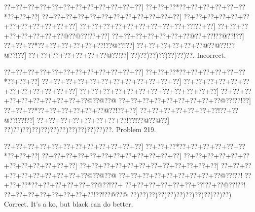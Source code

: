 \documentclass[a5paper]{article}
\begin{document}
\begin{center}
{\goo
\0??+\0??+\0??+\0??+\0??+\0??+\0??+\0??+\0??+\0??+\0??+\0??]
\0??+\0??+\0??*\0??+\0??+\0??+\0??+\0??+\0??*\0??+\0??+\0??]
\0??+\0??+\0??+\0??+\0??+\0??+\0??+\0??+\0??+\0??+\0??+\0??]
\0??+\0??+\0??+\0??+\0??+\0??+\0??+\0??+\0??+\0??+\0??+\0??]
\0??+\0??+\0??+\0??+\0??+\0??+\0??+\0??+\0??+\0??!\0??+\0??]
\0??+\0??+\0??+\0??+\0??+\0??+\0??+\0??@\0??@\0??!\0??+\0??]
\0??+\0??+\0??+\0??+\0??+\0??+\0??@\0??+\0??!\0??@\0??!\0??]
\0??+\0??+\0??*\0??+\0??+\0??+\0??+\0??+\0??!\0??@\0??!\0??]
\0??+\0??+\0??+\0??+\0??+\0??@\0??@\0??!\0??@\0??!\0??]
\0??+\0??+\0??+\0??+\0??+\0??+\0??@\0??!\0??]
\0??)\0??)\0??)\0??)\0??)\0??)\0??.
}
Incorrect. 

\end{center}
\newpage
\begin{center}
{\goo
\0??+\0??+\0??+\0??+\0??+\0??+\0??+\0??+\0??+\0??+\0??+\0??]
\0??+\0??+\0??*\0??+\0??+\0??+\0??+\0??+\0??*\0??+\0??+\0??]
\0??+\0??+\0??+\0??+\0??+\0??+\0??+\0??+\0??+\0??+\0??+\0??]
\0??+\0??+\0??+\0??+\0??+\0??+\0??+\0??+\0??+\0??+\0??+\0??]
\0??+\0??+\0??+\0??+\0??+\0??+\0??+\0??+\0??+\0??+\0??+\0??]
\0??+\0??+\0??+\0??+\0??+\0??+\0??+\0??+\0??+\0??@\0??@\0??@
\0??+\0??+\0??+\0??+\0??+\0??+\0??+\0??+\0??@\0??!\0??!\0??]
\0??+\0??+\0??*\0??+\0??+\0??+\0??+\0??+\0??@\0??!\0??+\0??]
\0??+\0??+\0??+\0??+\0??+\0??+\0??!\0??+\0??@\0??!\0??!\0??]
\0??+\0??+\0??+\0??+\0??+\0??+\0??+\0??!\0??!\0??@\0??@\0??]
\0??)\0??)\0??)\0??)\0??)\0??)\0??)\0??)\0??)\0??)\0??)\0??.
}
Problem 219.

\end{center}
\begin{center}
{\goo
\0??+\0??+\0??+\0??+\0??+\0??+\0??+\0??+\0??+\0??+\0??+\0??]
\0??+\0??+\0??*\0??+\0??+\0??+\0??+\0??+\0??*\0??+\0??+\0??]
\0??+\0??+\0??+\0??+\0??+\0??+\0??+\0??+\0??+\0??+\0??+\0??]
\0??+\0??+\0??+\0??+\0??+\0??+\0??+\0??+\0??+\0??+\0??+\0??]
\0??+\0??+\0??+\0??+\0??+\0??+\0??+\0??+\0??+\0??+\0??+\0??]
\0??+\0??+\0??+\0??+\0??+\0??+\0??+\0??+\0??+\0??@\0??@\0??@
\0??+\0??+\0??+\0??+\0??+\0??+\0??+\0??+\0??@\0??!\0??!
\0??+\0??+\0??*\0??+\0??+\0??+\0??+\0??+\0??@\0??!\0??+
\0??+\0??+\0??+\0??+\0??+\0??+\0??!\0??+\0??@\0??!\0??!
\0??+\0??+\0??+\0??+\0??+\0??+\0??+\0??!\0??!\0??@\0??@
\0??)\0??)\0??)\0??)\0??)\0??)\0??)\0??)\0??)\0??)\0??)
}
Correct. It's a ko, but black can do better.

\end{center}
\end{document}
